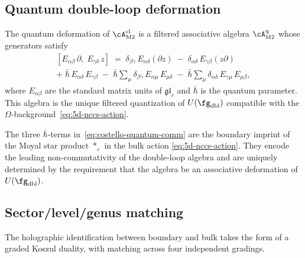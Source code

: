 \subsection{Quantum double-loop deformation}

\begin{proposition}
\label{prop:costello-quantum-double-loop}
The quantum deformation of $\cA^{\mathrm{cl}}_{\mathrm{M2}}$ is a
filtered associative algebra $\cA_{\mathrm{M2}}^{\mathrm{q}}$ whose
generators satisfy
\begin{multline}\label{eq:costello-quantum-comm}
 [E_{\alpha\beta}\,\partial,\; E_{\gamma\delta}\,z]
 \;=\;
 \delta_{\beta\gamma}\,E_{\alpha\delta}(\partial z)
 \;-\;
 \delta_{\alpha\delta}\,E_{\gamma\beta}(z\partial)\\
 +\;\bar\hbar\,E_{\alpha\delta}\,E_{\gamma\beta}
 \;-\;
 \bar\hbar \sum_\mu \delta_{\beta\gamma}\,
 E_{\alpha\mu}\,E_{\mu\delta}
 \;-\;
 \bar\hbar \sum_\mu \delta_{\alpha\delta}\,
 E_{\gamma\mu}\,E_{\mu\beta},
\end{multline}
where $E_{\alpha\beta}$ are the standard matrix units of
$\mathfrak{gl}_r$ and $\bar\hbar$ is the quantum parameter.
This algebra is the unique filtered quantization of
$U(\fg_{\mathrm{dbl}})$ compatible with the
$\Omega$-background~\eqref{eq:5d-nccs-action}.
\end{proposition}

\begin{remark}
\label{rem:quantum-hbar-corrections}
The three $\bar\hbar$-terms
in~\eqref{eq:costello-quantum-comm} are the boundary imprint of
the Moyal star product $*_\varepsilon$ in the bulk action
\eqref{eq:5d-nccs-action}. They encode the leading
non-commutativity of the double-loop algebra and are uniquely
determined by the requirement that the algebra be an associative
deformation of $U(\fg_{\mathrm{dbl}})$.
\end{remark}

\subsection{Sector/level/genus matching}

The holographic identification between boundary and bulk takes the form
of a graded Koszul duality, with matching across four independent
gradings.


